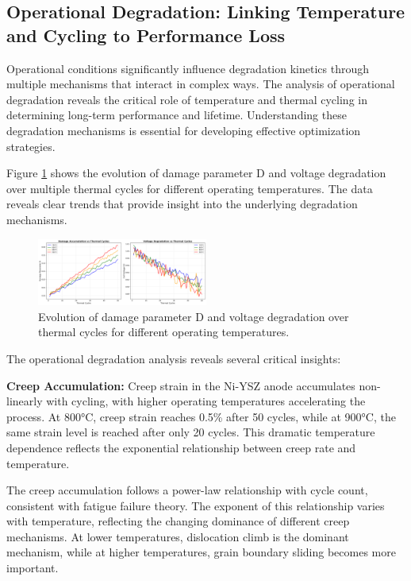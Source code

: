 \documentclass[conference]{IEEEtran}
\begin{document}
\subsection{Operational Degradation: Linking Temperature and Cycling to Performance Loss}

Operational conditions significantly influence degradation kinetics through multiple mechanisms that interact in complex ways. The analysis of operational degradation reveals the critical role of temperature and thermal cycling in determining long-term performance and lifetime. Understanding these degradation mechanisms is essential for developing effective optimization strategies.

Figure \ref{fig:degradation_kinetics} shows the evolution of damage parameter D and voltage degradation over multiple thermal cycles for different operating temperatures. The data reveals clear trends that provide insight into the underlying degradation mechanisms.

\begin{figure}[htbp]
\centering
\includegraphics[width=0.5\textwidth]{degradation_kinetics.png}
\caption{Evolution of damage parameter D and voltage degradation over thermal cycles for different operating temperatures.}
\label{fig:degradation_kinetics}
\end{figure}

The operational degradation analysis reveals several critical insights:

\textbf{Creep Accumulation:} Creep strain in the Ni-YSZ anode accumulates non-linearly with cycling, with higher operating temperatures accelerating the process. At 800°C, creep strain reaches 0.5\% after 50 cycles, while at 900°C, the same strain level is reached after only 20 cycles. This dramatic temperature dependence reflects the exponential relationship between creep rate and temperature.

The creep accumulation follows a power-law relationship with cycle count, consistent with fatigue failure theory. The exponent of this relationship varies with temperature, reflecting the changing dominance of different creep mechanisms. At lower temperatures, dislocation climb is the dominant mechanism, while at higher temperatures, grain boundary sliding becomes more important.
\end{document}
